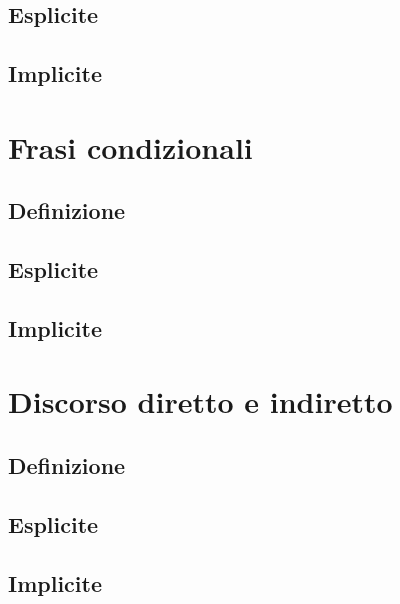 \documentclass[
  a4paper,
  twoside,
  11pt,
  chapterprefix=false,
  bibliography=totocnumbered,
  listof=flat]{scrbook}
\begin{document}
\hypertarget{esplicite-4}{%
\section{Esplicite}\label{esplicite-4}}

\hypertarget{implicite-4}{%
\section{Implicite}\label{implicite-4}}

\hypertarget{frasi-condizionali}{%
\chapter{Frasi condizionali}\label{frasi-condizionali}}

\hypertarget{definizione-4}{%
\section{Definizione}\label{definizione-4}}

\hypertarget{esplicite-5}{%
\section{Esplicite}\label{esplicite-5}}

\hypertarget{implicite-5}{%
\section{Implicite}\label{implicite-5}}

\hypertarget{discorso-diretto-e-indiretto}{%
\chapter{Discorso diretto e indiretto}\label{discorso-diretto-e-indiretto}}

\hypertarget{definizione-5}{%
\section{Definizione}\label{definizione-5}}

\hypertarget{esplicite-6}{%
\section{Esplicite}\label{esplicite-6}}

\hypertarget{implicite-6}{%
\section{Implicite}\label{implicite-6}}

\backmatter
  
\end{document}
